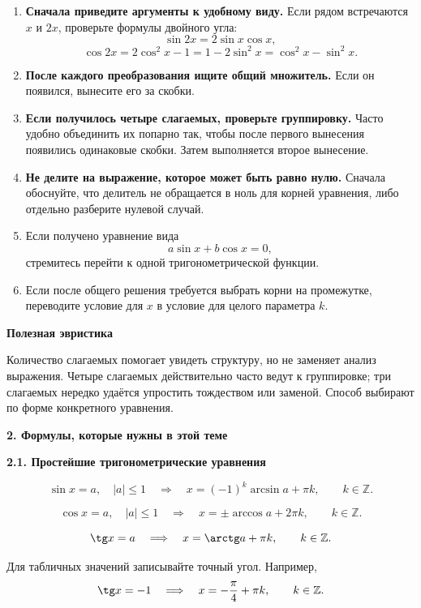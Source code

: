 \documentclass[a4paper,12pt]{article}
\newcommand{\sect}[1]{%
  \vspace{0.45em}%
  {\Large\bfseries\color{darkaccent}#1}\par
  \vspace{0.2em}%
  \noindent{\color{rulegray}\rule{\linewidth}{0.6pt}}%
  \vspace{0.35em}%
}
\newcommand{\subsect}[1]{%
  \vspace{0.35em}%
  {\large\bfseries\color{accent}#1}\par
  \vspace{0.1em}%
}
\newcommand{\key}[1]{\textbf{\color{darkaccent}#1}}
\newcommand{\Z}{\mathbb{Z}}
\begin{document}
\begin{enumerate}
  \item
  \key{Сначала приведите аргументы к удобному виду.}
  Если рядом встречаются $x$ и $2x$, проверьте формулы двойного угла:
  \[
    \sin 2x=2\sin x\cos x,
  \]
  \[
    \cos 2x
    =2\cos^2x-1
    =1-2\sin^2x
    =\cos^2x-\sin^2x.
  \]

  \item
  \key{После каждого преобразования ищите общий множитель.}
  Если он появился, вынесите его за скобки.

  \item
  \key{Если получилось четыре слагаемых, проверьте группировку.}
  Часто удобно объединить их попарно так, чтобы после первого вынесения
  появились одинаковые скобки. Затем выполняется второе вынесение.

  \item
  \key{Не делите на выражение, которое может быть равно нулю.}
  Сначала обоснуйте, что делитель не обращается в ноль для корней
  уравнения, либо отдельно разберите нулевой случай.

  \item
  Если получено уравнение вида
  \[
    a\sin x+b\cos x=0,
  \]
  стремитесь перейти к одной тригонометрической функции.

  \item
  Если после общего решения требуется выбрать корни на промежутке,
  переводите условие для $x$ в условие для целого параметра $k$.
\end{enumerate}

\subsect{Полезная эвристика}

Количество слагаемых помогает увидеть структуру, но не заменяет анализ
выражения. Четыре слагаемых действительно часто ведут к группировке;
три слагаемых нередко удаётся упростить тождеством или заменой.
Способ выбирают по форме конкретного уравнения.

\sect{2. Формулы, которые нужны в этой теме}

\subsect{2.1. Простейшие тригонометрические уравнения}

\[
\sin x=a,\quad |a|\le1
\quad\Longrightarrow\quad
x=(-1)^k\arcsin a+\pi k,
\qquad k\in\Z.
\]

\[
\cos x=a,\quad |a|\le1
\quad\Longrightarrow\quad
x=\pm\arccos a+2\pi k,
\qquad k\in\Z.
\]

\[
\tg x=a
\quad\Longrightarrow\quad
x=\arctg a+\pi k,
\qquad k\in\Z.
\]

Для табличных значений записывайте точный угол. Например,
\[
\tg x=-1
\quad\Longrightarrow\quad
x=-\frac{\pi}{4}+\pi k,
\qquad k\in\Z.
\]
\end{document}
